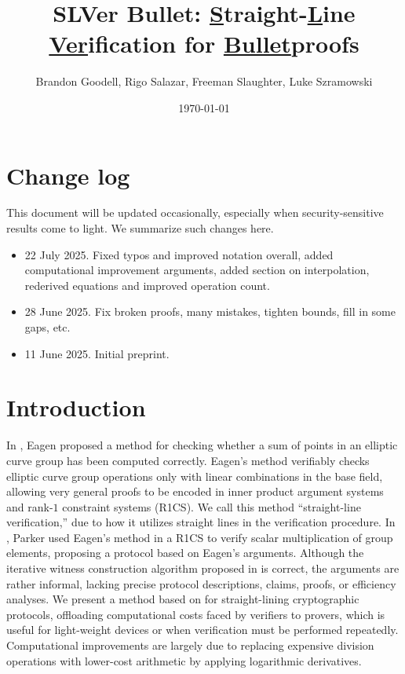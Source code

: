 \documentclass[11pt,letterpaper]{article}
\title{
SLVer Bullet: \underline{S}traight-\underline{L}ine \underline{Ver}ification for \underline{Bullet}proofs
}
\author{Brandon Goodell, Rigo Salazar, Freeman Slaughter, Luke Szramowski
}
\affil{$\mathsf{Cypher \ Stack}$}
\date{\today}
\theoremstyle{definition}
\newcommand{\6}{\mathbf}
\newcommand{\7}{\mathcal}
\begin{document}
\maketitle




\section*{Change log}

This document will be updated occasionally, especially when security-sensitive results come to light. We summarize such changes here.
\begin{itemize}

\item 22 July 2025. Fixed typos and improved notation overall, added computational improvement arguments, added section on interpolation, rederived equations and improved operation count.


\item 28 June 2025. Fix broken proofs, many mistakes, tighten bounds, fill in some gaps, etc.

\item 11 June 2025. Initial preprint.
\end{itemize}


\section{Introduction}


In \cite{Eagen}, Eagen proposed a method for checking whether a sum of points in an elliptic curve group has been computed correctly. Eagen's method verifiably checks elliptic curve group operations only with linear combinations in the base field, allowing very general proofs to be encoded in inner product argument systems and rank-$1$ constraint systems (R1CS). We call this method ``straight-line verification,'' due to how it utilizes straight lines in the verification procedure.
In \cite{Kayaba}, Parker used Eagen's method in a R1CS to verify scalar multiplication of group elements, proposing a protocol based on Eagen's arguments. 
Although the iterative witness construction algorithm proposed in \cite{Eagen} is correct, the arguments are rather informal, lacking precise protocol descriptions, claims, proofs, or efficiency analyses. 
We present a method based on \cite{Eagen} for straight-lining  cryptographic protocols, offloading computational costs faced by verifiers to provers, which is useful for light-weight devices or when verification must be performed repeatedly. Computational improvements are largely due to replacing expensive division operations with lower-cost arithmetic by applying logarithmic derivatives.
\end{document}
